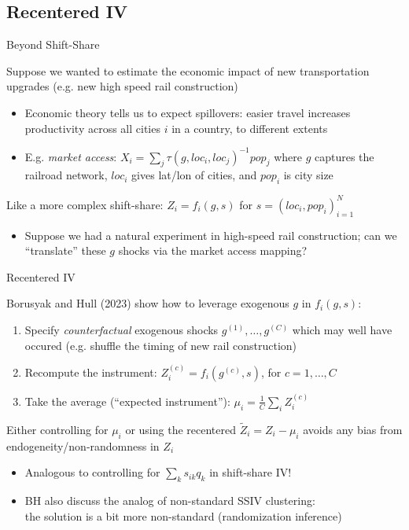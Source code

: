 \documentclass{beamer}
\begin{document}
\subsection{Recentered IV}
\begin{frame}{Beyond Shift-Share}

Suppose we wanted to estimate the economic impact of new transportation upgrades (e.g. new high speed rail construction)
\begin{itemize}
\item Economic theory tells us to expect spillovers: easier travel increases productivity across all cities $i$ in a country, to different extents
\item E.g. \emph{market access}: $X_i=\sum_j \tau(g,loc_i,loc_j)^{-1}pop_j$ where $g$ captures the railroad network, $loc_i$ gives lat/lon of cities, and $pop_i$ is city size
\end{itemize}\bigskip\pause{}

Like a more complex shift-share: $Z_i=f_i(g,s)$ for $s=(loc_i,pop_i)_{i=1}^{N}$
\begin{itemize}
\item Suppose we had a natural experiment in high-speed rail construction; can we ``translate'' these $g$ shocks via the market access mapping?
\end{itemize}
\end{frame}

\begin{frame}{Recentered IV}

Borusyak and Hull (2023) show how to leverage exogenous $g$ in $f_i(g,s)$:
\begin{enumerate}
\item Specify \emph{counterfactual} exogenous shocks $g^{(1)},\dots,g^{(C)}$ which may well have occured (e.g. shuffle the timing of new rail construction)
\item Recompute the instrument: $Z_i^{(c)}=f_i(g^{(c)},s)$, for $c=1,\dots,C$
\item Take the average (``expected instrument''): $\mu_i=\frac{1}{C}\sum_i Z_i^{(c)}$
\end{enumerate}\bigskip\pause{}

Either controlling for $\mu_i$ or using the recentered $\tilde{Z}_i=Z_i-\mu_i$ avoids any bias from endogeneity/non-randomness in $Z_i$
\begin{itemize}
\item Analogous to controlling for $\sum_k s_{ik}q_k$ in shift-share IV! 
\item BH also discuss the analog of non-standard SSIV clustering:\\ the solution is a bit more non-standard (randomization inference)
\end{itemize}

\end{frame}
\end{document}
